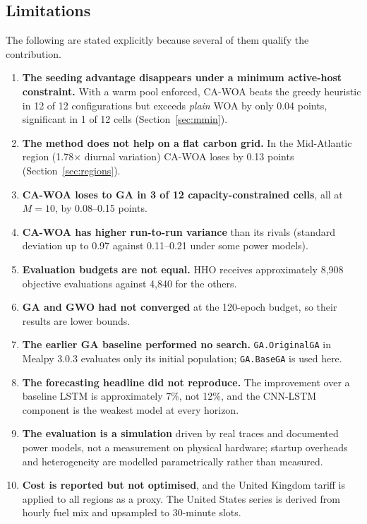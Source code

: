 \documentclass[12pt,a4paper]{article}
\begin{document}
\subsection{Limitations}\label{sec:limits}
The following are stated explicitly because several of them qualify the contribution.
\begin{enumerate}
\item \textbf{The seeding advantage disappears under a minimum active-host constraint.} With a warm pool
enforced, CA-WOA beats the greedy heuristic in 12 of 12 configurations but exceeds \emph{plain} WOA by only
0.04 points, significant in 1 of 12 cells (Section~\ref{sec:mmin}).
\item \textbf{The method does not help on a flat carbon grid.} In the Mid-Atlantic region (1.78$\times$ diurnal
variation) CA-WOA loses by 0.13 points (Section~\ref{sec:regions}).
\item \textbf{CA-WOA loses to GA in 3 of 12 capacity-constrained cells}, all at $M=10$, by 0.08--0.15 points.
\item \textbf{CA-WOA has higher run-to-run variance} than its rivals (standard deviation up to 0.97 against
0.11--0.21 under some power models).
\item \textbf{Evaluation budgets are not equal.} HHO receives approximately 8{,}908 objective evaluations
against 4{,}840 for the others.
\item \textbf{GA and GWO had not converged} at the 120-epoch budget, so their results are lower bounds.
\item \textbf{The earlier GA baseline performed no search.} \texttt{GA.OriginalGA} in Mealpy 3.0.3 evaluates
only its initial population; \texttt{GA.BaseGA} is used here.
\item \textbf{The forecasting headline did not reproduce.} The improvement over a baseline LSTM is
approximately 7\%, not 12\%, and the CNN-LSTM component is the weakest model at every horizon.
\item \textbf{The evaluation is a simulation} driven by real traces and documented power models, not a
measurement on physical hardware; startup overheads and heterogeneity are modelled parametrically rather than
measured.
\item \textbf{Cost is reported but not optimised}, and the United Kingdom tariff is applied to all regions as
a proxy. The United States series is derived from hourly fuel mix and upsampled to 30-minute slots.
\end{enumerate}
\end{document}
